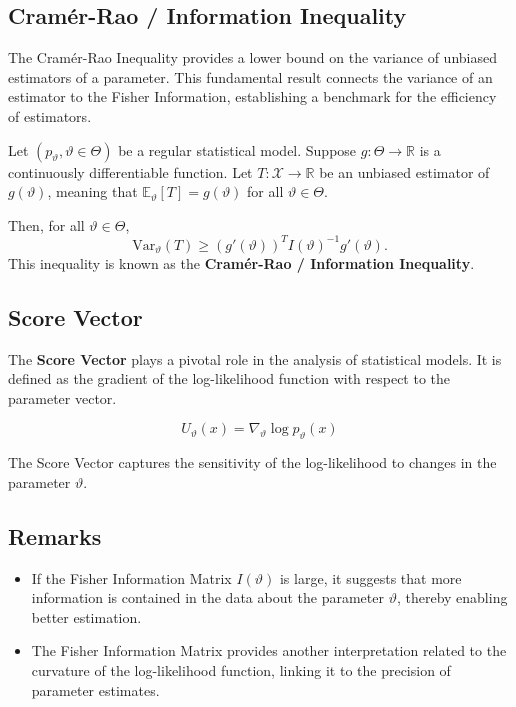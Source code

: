 \documentclass[open=any, 11pt,paper=A4]{scrreprt}
\begin{document}
\subsection*{Cramér-Rao / Information Inequality}

The Cramér-Rao Inequality provides a lower bound on the variance of unbiased estimators of a parameter. This fundamental result connects the variance of an estimator to the Fisher Information, establishing a benchmark for the efficiency of estimators.

\begin{theorem}
    Let \((p_\vartheta, \vartheta \in \Theta)\) be a regular statistical model. Suppose \(g: \Theta \to \mathbb{R}\) is a continuously differentiable function. Let \(T: \mathcal{X} \to \mathbb{R}\) be an unbiased estimator of \(g(\vartheta)\), meaning that \(\mathbb{E}_\vartheta[T] = g(\vartheta)\) for all \(\vartheta \in \Theta\).

    Then, for all \(\vartheta \in \Theta\),
    \[
    \text{Var}_\vartheta(T) \geq \left( g'(\vartheta) \right)^T I(\vartheta)^{-1} g'(\vartheta).
    \]
    This inequality is known as the \textbf{Cramér-Rao / Information Inequality}.
\end{theorem}

\subsection*{Score Vector}

The \textbf{Score Vector} plays a pivotal role in the analysis of statistical models. It is defined as the gradient of the log-likelihood function with respect to the parameter vector.

\[
U_\vartheta(x) = \nabla_\vartheta \log p_\vartheta(x)
\]

The Score Vector captures the sensitivity of the log-likelihood to changes in the parameter \(\vartheta\).

\subsection*{Remarks}

\begin{itemize}
    \item If the Fisher Information Matrix \(I(\vartheta)\) is large, it suggests that more information is contained in the data about the parameter \(\vartheta\), thereby enabling better estimation.
    \item The Fisher Information Matrix provides another interpretation related to the curvature of the log-likelihood function, linking it to the precision of parameter estimates.
\end{itemize}
\end{document}

